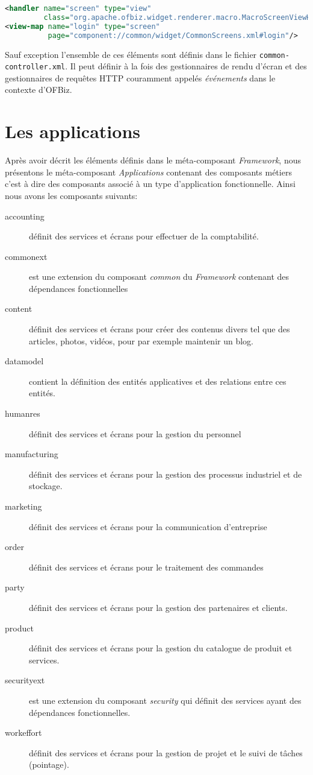 \documentclass[a4paper, 11pt]{report}
\begin{document}
\begin{lstlisting}[language=xml]
<handler name="screen" type="view"
         class="org.apache.ofbiz.widget.renderer.macro.MacroScreenViewHandler"/>
<view-map name="login" type="screen"
          page="component://common/widget/CommonScreens.xml#login"/>
\end{lstlisting}

Sauf exception l'ensemble de ces éléments sont définis dans le fichier
\verb=common-controller.xml=. Il peut définir à la fois des
gestionnaires de rendu d'écran et des gestionnaires de requêtes HTTP
couramment appelés \emph{événements} dans le contexte d'OFBiz.

\section{Les applications}

Après avoir décrit les éléments définis dans le méta-composant
\emph{Framework}, nous présentons le méta-composant
\emph{Applications} contenant des composants métiers c'est à dire des
composants associé à un type d'application fonctionnelle. Ainsi nous
avons les composants suivants:

\begin{description}
\item[accounting] définit des services et écrans pour effectuer de la
  comptabilité.
\item[commonext] est une extension du composant \emph{common} du
  \emph{Framework} contenant des dépendances fonctionnelles
\item[content] définit des services et écrans pour créer des contenus
  divers tel que des articles, photos, vidéos, pour par exemple
  maintenir un blog.
\item[datamodel] contient la définition des entités
  applicatives et des relations entre ces entités.
\item[humanres] définit des services et écrans pour la gestion du
  personnel
\item[manufacturing] définit des services et écrans pour la gestion des
  processus industriel et de stockage.
\item[marketing] définit des services et écrans pour la communication
  d'entreprise
\item[order] définit des services et écrans pour le traitement des commandes
\item[party] définit des services et écrans pour la gestion des
  partenaires et clients.
\item[product] définit des services et écrans pour la gestion du
  catalogue de produit et services.
\item[securityext] est une extension du composant \emph{security} qui
  définit des services ayant des dépendances fonctionnelles.
\item[workeffort] définit des services et écrans pour la gestion de
  projet et le suivi de tâches (pointage).
\end{description}
\end{document}
